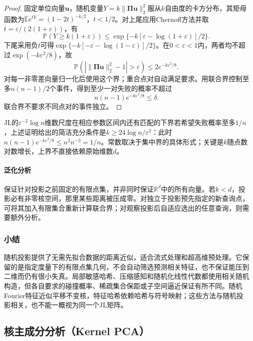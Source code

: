 \begin{proof}
固定单位向量$\bm{u}$，随机变量$Y=k\lVert\bm{\Pi}\bm{u}\rVert_2^2$服从$k$自由度的卡方分布，其矩母函数为$\mathbb{E}e^{tY}=(1-2t)^{-k/2}$，$t<1/2$。对上尾应用Chernoff方法并取$t=\varepsilon/(2(1+\varepsilon))$，有
\[
  \mathbb{P}(Y\geq k(1+\varepsilon))
  \leq\exp\{-k[\varepsilon-\log(1+\varepsilon)]/2\}.
\]
下尾采用负$t$可得$\exp\{-k[-\varepsilon-\log(1-\varepsilon)]/2\}$。在$0<\varepsilon<1$内，两者均不超过$\exp(-k\varepsilon^2/8)$，故
\[
  \mathbb{P}\left(
   \left|\lVert\bm{\Pi}\bm{u}\rVert_2^2-1\right|>\varepsilon
   \right)\leq2e^{-k\varepsilon^2/8}.
\]
对每一非零差向量归一化后使用这个界；重合点对自动满足要求。用联合界控制至多$n(n-1)/2$个事件，得到至少一对失败的概率不超过
\[
  n(n-1)e^{-k\varepsilon^2/8}\leq\delta.
\]
联合界不要求不同点对的事件独立。
\end{proof}

JL的$\varepsilon^{-2}\log n$维数尺度在相应参数区间内还有匹配的下界若希望失败概率至多$1/n$，上述证明给出的简洁充分条件是$k\geq24\log n/\varepsilon^2$：此时$n(n-1)e^{-k\varepsilon^2/8}\leq n^2n^{-3}=1/n$。常数取决于集中界的具体形式；关键是$k$随点数对数增长，上界不直接依赖原始维数$d$。

\paragraph{泛化分析}

保证针对投影之前固定的有限点集，并非同时保证$\mathbb{R}^{d}$中的所有向量。若$k<d$，投影必有非零核空间，那里某些距离被压成零。对独立于投影预先指定的新查询点，可将其加入有限集合重新计算联合界；对观察投影后自适应选出的任意查询，则需要额外分析。

\subsubsection{小结}
\label{sec:dim-rp-summary}

随机投影提供了无需先拟合数据的距离近似，适合流式处理和超高维预处理。它保留的是指定度量下的有限点集几何，不会自动筛选预测相关特征，也不保证能压到二维而仍有很小失真。局部敏感哈希、压缩感知和随机化线性代数都使用相关随机构造，但各自要求的碰撞概率、稀疏集合保距或子空间逼近保证有所不同。随机Fourier特征近似平移不变核，特征哈希依赖哈希与符号映射；这些方法与随机投影相关，也不能一概视为同一个JL矩阵。

\subsection{核主成分分析（Kernel PCA）}
\label{sec:dim-kpca}

